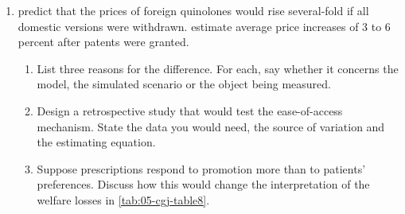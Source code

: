 \begin{enumerate}[label=\arabic*., leftmargin=*, itemsep=6pt]
\item \citet{ChaudhuriGoldbergJia2006} predict that the prices of foreign quinolones would rise several-fold if
all domestic versions were withdrawn. \citet{DugganGarthwaiteGoyal2016} estimate average price increases of 3 to 6
percent after patents were granted.
\begin{enumerate}[label=(\alph*)]
  \item List three reasons for the difference. For each, say whether it concerns the model, the simulated scenario
  or the object being measured.
  \item Design a retrospective study that would test the ease-of-access mechanism. State the data you would need,
  the source of variation and the estimating equation.
  \item Suppose prescriptions respond to promotion more than to patients' preferences. Discuss how this would
  change the interpretation of the welfare losses in \cref{tab:05-cgj-table8}.
\end{enumerate}

\end{enumerate}
